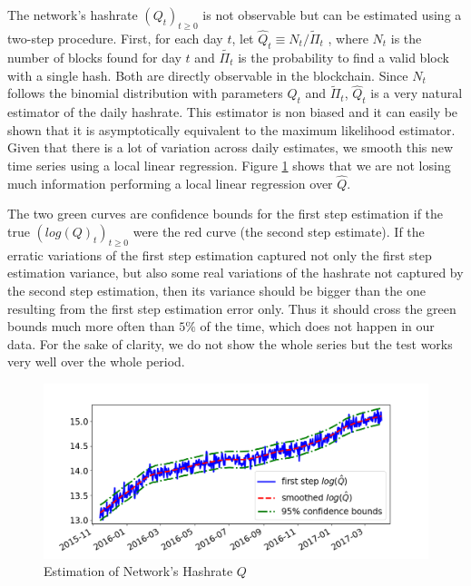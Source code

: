 \documentclass[12pt, a4paper]{article}
\makeatletter
\renewcommand{\section}{\@startsection{section}{2}{0mm}{-0.8\baselineskip}{.5\baselineskip}{\normalfont\large\bfseries}}
\makeatother
\begin{document}
\section{Estimation of Q}

\label{app:estimation_Q}

The network's hashrate $(Q_t)_{t\geq 0}$ is not observable but can be estimated using a two-step
procedure. First, for each day $t$, let $\hat{Q}_t \equiv N_t/\tilde{\Pi}_t$%
, where $N_t$ is the number of blocks found for day $t$ and $\tilde{\Pi_t}$
is the probability to find a valid block with a single hash. Both are
directly observable in the blockchain. Since $N_t$ follows the binomial distribution with parameters $Q_t$ and $\tilde{\Pi}_t$, $\hat{Q}_t$ is a very natural estimator of the daily
hashrate. This estimator is non biased and it can easily be shown that it is
asymptotically equivalent to the maximum likelihood estimator. Given that
there is a lot of variation across daily estimates, we smooth this
new time series using a local linear regression. Figure \ref{fig:Q} shows that we
are not losing much information performing a local linear regression over $%
\hat{Q}$.




The two green curves are confidence bounds for the first step estimation if
the true $(log\left(Q\right)_t)_{t\geq 0}$ were the red curve (the second
step estimate). If the erratic variations of the first step estimation
captured not only the first step estimation variance, but also some real
variations of the hashrate not captured by the second step estimation, then
its variance should be bigger than the one resulting from the first step
estimation error only. Thus it should cross the green bounds much more often
than $5\%$ of the time, which does not happen in our data. For the sake of
clarity, we do not show the whole series but the test works very well over
the whole period.

\begin{figure}[H]
\caption{Estimation of Network's Hashrate $Q$}
\label{fig:Q}\centering
\includegraphics[scale=0.56]{images/comparaison_Q_Q_chap_log.png}
\end{figure}
\end{document}
